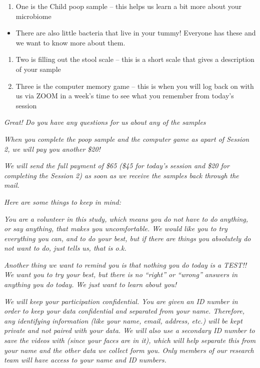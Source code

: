 \documentclass[]{book}
\providecommand{\tightlist}{%
  \setlength{\itemsep}{0pt}\setlength{\parskip}{0pt}}
\begin{document}
\begin{enumerate}
\def\labelenumi{\arabic{enumi}.}
\tightlist
\item
  One is the Child poop sample -- this helps us learn a bit more about your microbiome
\end{enumerate}

\begin{itemize}
\tightlist
\item
  There are also little bacteria that live in your tummy! Everyone has these and we want to know more about them.
\end{itemize}

\begin{enumerate}
\def\labelenumi{\arabic{enumi}.}
\setcounter{enumi}{1}
\tightlist
\item
  Two is filling out the stool scale -- this is a short scale that gives a description of your sample
\item
  Three is the computer memory game -- this is when you will log back on with us via ZOOM in a week's time to see what you remember from today's session
\end{enumerate}

\emph{Great! Do you have any questions for us about any of the samples}

\emph{When you complete the poop sample and the computer game as apart of Session 2, we will pay you another \$20!}

\emph{We will send the full payment of \$65 (\$45 for today's session and \$20 for completing the Session 2) as soon as we receive the samples back through the mail.}

\emph{Here are some things to keep in mind:}

\emph{You are a volunteer in this study, which means you do not have to do anything, or say anything, that makes you uncomfortable. We would like you to try everything you can, and to do your best, but if there are things you absolutely do not want to do, just tells us, that is o.k.}

\emph{Another thing we want to remind you is that nothing you do today is a TEST!! We want you to try your best, but there is no ``right'' or ``wrong'' answers in anything you do today. We just want to learn about you!}

\emph{We will keep your participation confidential. You are given an ID number in order to keep your data confidential and separated from your name. Therefore, any identifying information (like your name, email, address, etc.) will be kept private and not paired with your data. We will also use a secondary ID number to save the videos with (since your faces are in it), which will help separate this from your name and the other data we collect form you. Only members of our research team will have access to your name and ID numbers.}
\end{document}
